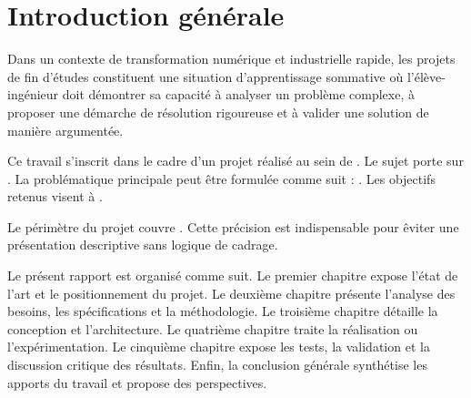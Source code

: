 \chapter*{Introduction g\'en\'erale}


Dans un contexte de transformation num\'erique et industrielle rapide, les projets de fin d'\'etudes constituent une situation d'apprentissage sommative o\`u l'\'el\`eve-ing\'enieur doit d\'emontrer sa capacit\'e \`a analyser un probl\`eme complexe, \`a proposer une d\'emarche de r\'esolution rigoureuse et \`a valider une solution de mani\`ere argument\'ee.

Ce travail s'inscrit dans le cadre d'un projet r\'ealis\'e au sein de \CompanyName. Le sujet porte sur . La probl\'ematique principale peut \^etre formul\'ee comme suit : . Les objectifs retenus visent \`a .

Le p\'erim\`etre du projet couvre . Cette pr\'ecision est indispensable pour \^eviter une pr\'esentation descriptive sans logique de cadrage. \disciplinehint

Le pr\'esent rapport est organis\'e comme suit. Le premier chapitre expose l'\'etat de l'art et le positionnement du projet. Le deuxi\`eme chapitre pr\'esente l'analyse des besoins, les sp\'ecifications et la m\'ethodologie. Le troisi\`eme chapitre d\'etaille la conception et l'architecture. Le quatri\`eme chapitre traite la r\'ealisation ou l'exp\'erimentation. Le cinqui\`eme chapitre expose les tests, la validation et la discussion critique des r\'esultats. Enfin, la conclusion g\'en\'erale synth\'etise les apports du travail et propose des perspectives.
